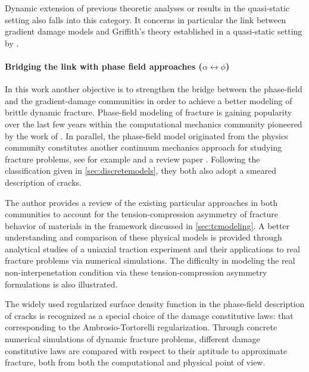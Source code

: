 Dynamic extension of previous theoretic analyses or results in the quasi-static setting also falls into this category. It concerns in particular the link between gradient damage models and Griffith's theory established in a quasi-static setting by \cite{SicsicMarigo:2013}.

\paragraph{Bridging the link with phase field approaches ($\alpha\leftrightarrow\phi$)} In this work another objective is to strengthen the bridge between the phase-field and the gradient-damage communities in order to achieve a better modeling of brittle dynamic fracture. Phase-field modeling of fracture is gaining popularity over the last few years within the computational mechanics community pioneered by the work of \cite{MieheHofackerWelschinger:2010,MieheWelschingerHofacker:2010}. In parallel, the phase-field model originated from the physics community constitutes another continuum mechanics approach for studying fracture problems, see for example \cite{KarmaKesslerLevine:2001,HakimKarma:2009} and a review paper \cite{SpatscheckBrenerKarm:2011}. Following the classification given in \cref{sec:discretemodels}, they both also adopt a smeared description of cracks.

The author provides a review of the existing particular approaches in both communities to account for the tension-compression asymmetry of fracture behavior of materials in the framework discussed in \cref{sec:tcmodeling}. A better understanding and comparison of these physical models is provided through analytical studies of a uniaxial traction experiment and their applications to real fracture problems via numerical simulations. The difficulty in modeling the real non-interpenetation condition via these tension-compression asymmetry formulations is also illustrated.

The widely used regularized surface density function in the phase-field description of cracks is recognized as a special choice of the damage constitutive laws: that corresponding to the Ambrosio-Tortorelli regularization. Through concrete numerical simulations of dynamic fracture problems, different damage constitutive laws are compared with respect to their aptitude to approximate fracture, both from both the computational and physical point of view.

